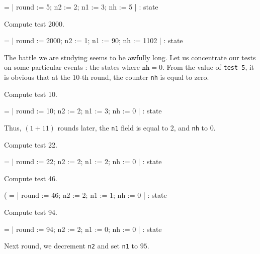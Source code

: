 \begin{Coqanswer}
  = {| round := 5; n2 := 2; n1 := 3; nh := 5 |}
     : state
\end{Coqanswer}

\begin{Coqsrc}
Compute test 2000.
\end{Coqsrc}

\begin{Coqanswer}
  = {| round := 2000; n2 := 1; n1 := 90; nh := 1102 |}
     : state
\end{Coqanswer}


The battle we are studying seems to be awfully long. Let us concentrate our
tests on some particular events : the states where $\texttt{nh}=0$.
From the value of \texttt{test 5},  it is obvious that at the 10-th round, the counter \texttt{nh} is equal to zero.

 \begin{Coqsrc}
 Compute test 10.
\end{Coqsrc}

\begin{Coqanswer}
    = {| round := 10; n2 := 2; n1 := 3; nh := 0 |}
     : state
 \end{Coqanswer}

Thus, $ (1 + 11)$ rounds later, the \texttt{n1} field is equal to $2$, and 
\texttt{nh}   to $0$. 


\begin{Coqsrc}
Compute test 22.
\end{Coqsrc}

\begin{Coqanswer}
 = {| round := 22; n2 := 2; n1 := 2; nh := 0 |}
     : state
\end{Coqanswer}


\begin{Coqsrc}
 Compute test 46.
\end{Coqsrc}

\begin{Coqanswer}
( = {| round := 46; n2 := 2; n1 := 1; nh := 0 |}
     : state
\end{Coqanswer}


\begin{Coqsrc}
Compute test 94.
\end{Coqsrc}

\begin{Coqanswer}
 = {| round := 94; n2 := 2; n1 := 0; nh := 0 |}
     : state
\end{Coqanswer}


Next round, we decrement \texttt{n2} and set \texttt{n1} to $95$.



